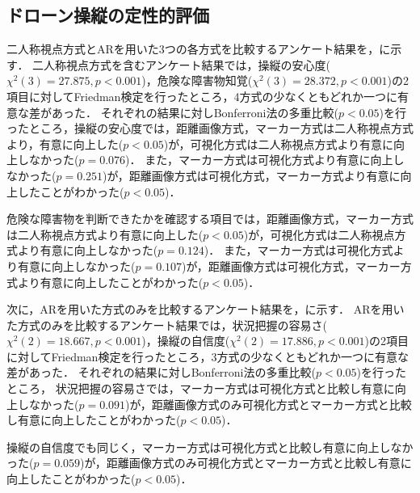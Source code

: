 \documentclass[submit, sigrecommended]{ipsj}
\begin{document}
\subsection{ドローン操縦の定性的評価}
\label{result_2}
二人称視点方式とARを用いた3つの各方式を比較するアンケート結果を，に示す．
二人称視点方式を含むアンケート結果では，操縦の安心度($\chi^{2}(3)=27.875, p < 0.001$)，危険な障害物知覚($\chi^{2}(3)=28.372, p < 0.001$)の2項目に対してFriedman検定を行ったところ，4方式の少なくともどれか一つに有意な差があった．
それぞれの結果に対しBonferroni法の多重比較($p < 0.05$)を行ったところ，操縦の安心度では，距離画像方式，マーカー方式は二人称視点方式より，有意に向上した($p < 0.05$)が，可視化方式は二人称視点方式より有意に向上しなかった($p = 0.076$)．
また，マーカー方式は可視化方式より有意に向上しなかった($p = 0.251$)が，距離画像方式は可視化方式，マーカー方式より有意に向上したことがわかった($p < 0.05$)．
\par
危険な障害物を判断できたかを確認する項目では，距離画像方式，マーカー方式は二人称視点方式より有意に向上した($p < 0.05$)が，可視化方式は二人称視点方式より有意に向上しなかった($p = 0.124$)．
また，マーカー方式は可視化方式より有意に向上しなかった($p = 0.107$)が，距離画像方式は可視化方式，マーカー方式より有意に向上したことがわかった($p < 0.05$)．
\par
次に，ARを用いた方式のみを比較するアンケート結果を，に示す．
ARを用いた方式のみを比較するアンケート結果では，状況把握の容易さ($\chi^{2}(2)=18.667, p < 0.001$)，操縦の自信度($\chi^{2}(2)=17.886, p < 0.001$)の2項目に対してFriedman検定を行ったところ，3方式の少なくともどれか一つに有意な差があった．
それぞれの結果に対しBonferroni法の多重比較($p < 0.05$)を行ったところ，
状況把握の容易さでは，マーカー方式は可視化方式と比較し有意に向上しなかった($p = 0.091$)が，距離画像方式のみ可視化方式とマーカー方式と比較し有意に向上したことがわかった($p < 0.05$)．
\par
操縦の自信度でも同じく，マーカー方式は可視化方式と比較し有意に向上しなかった($p = 0.059$)が，距離画像方式のみ可視化方式とマーカー方式と比較し有意に向上したことがわかった($p < 0.05$)．



\end{document}
